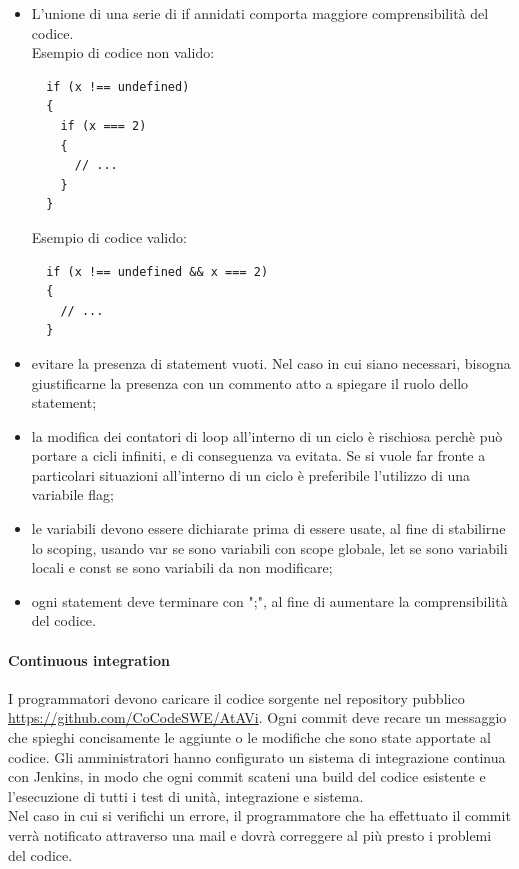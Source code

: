 \begin{itemize}
	\item L'unione di una serie di if annidati comporta maggiore comprensibilità del codice.\\
Esempio di codice non valido:
\begin{verbatim}
  if (x !== undefined) 
  {
    if (x === 2) 
    {
      // ...
    }
  }
\end{verbatim}
Esempio di codice valido:
\begin{verbatim}
  if (x !== undefined && x === 2) 
  {
    // ...
  }
\end{verbatim}
	\item evitare la presenza di statement vuoti. Nel caso in cui siano necessari, bisogna giustificarne la presenza con un commento atto a spiegare il ruolo dello statement;

	\item la modifica dei contatori di loop all'interno di un ciclo è rischiosa perchè può portare a cicli infiniti, e di conseguenza va evitata. Se si vuole far fronte a particolari situazioni all'interno di un ciclo è preferibile l'utilizzo di una variabile flag;

	\item le variabili devono essere dichiarate prima di essere usate, al fine di stabilirne lo scoping, usando var se sono variabili con scope globale, let se sono variabili locali e const se sono variabili da non modificare;
	\item ogni statement deve terminare con ";", al fine di aumentare la comprensibilità del codice.
	
\end{itemize}

\paragraph{Continuous integration}\label{CI}
I programmatori devono caricare il codice sorgente nel repository pubblico \url{https://github.com/CoCodeSWE/AtAVi}.
Ogni commit deve recare un messaggio che spieghi concisamente le aggiunte o le modifiche che sono state apportate al codice. Gli amministratori hanno configurato un sistema di integrazione continua con Jenkins, in modo che ogni commit scateni
una build del codice esistente e l'esecuzione di tutti i test di unità, integrazione e sistema. \\
Nel caso in cui si verifichi un errore, il programmatore che ha effettuato il commit verrà notificato attraverso una mail e dovrà correggere al più presto i problemi del codice.

